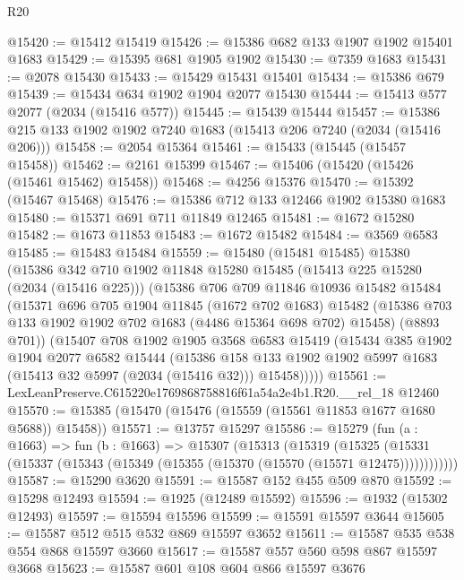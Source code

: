 \begin{lexlean}{R20}
\begin{coremodule}
@15420 := @15412 @15419
@15426 := @15386 @682 @133 @1907 @1902 @15401 @1683
@15429 := @15395 @681 @1905 @1902
@15430 := @7359 @1683
@15431 := @2078 @15430
@15433 := @15429 @15431 @15401
@15434 := @15386 @679
@15439 := @15434 @634 @1902 @1904 @2077 @15430
@15444 := @15413 @577 @2077 (@2034 (@15416 @577))
@15445 := @15439 @15444
@15457 := @15386 @215 @133 @1902 @1902 @7240 @1683 (@15413 @206 @7240 (@2034 (@15416 @206)))
@15458 := @2054 @15364
@15461 := @15433 (@15445 (@15457 @15458))
@15462 := @2161 @15399
@15467 := @15406 (@15420 (@15426 (@15461 @15462) @15458))
@15468 := @4256 @15376
@15470 := @15392 (@15467 @15468)
@15476 := @15386 @712 @133 @12466 @1902 @15380 @1683
@15480 := @15371 @691 @711 @11849 @12465
@15481 := @1672 @15280
@15482 := @1673 @11853
@15483 := @1672 @15482
@15484 := @3569 @6583
@15485 := @15483 @15484
@15559 := @15480
    (@15481 @15485)
    @15380
    (@15386
      @342
      @710
      @1902
      @11848
      @15280
      @15485
      (@15413 @225 @15280 (@2034 (@15416 @225)))
      (@15386
        @706
        @709
        @11846
        @10936
        @15482
        @15484
        (@15371
          @696
          @705
          @1904
          @11845
          (@1672 @702 @1683)
          @15482
          (@15386 @703 @133 @1902 @1902 @702 @1683 (@4486 @15364 @698 @702) @15458)
          (@8893 @701))
        (@15407
          @708
          @1902
          @1905
          @3568
          @6583
          @15419
          (@15434
            @385
            @1902
            @1904
            @2077
            @6582
            @15444
            (@15386
              @158
              @133
              @1902
              @1902
              @5997
              @1683
              (@15413 @32 @5997 (@2034 (@15416 @32)))
              @15458)))))
@15561 := LexLeanPreserve.C615220e1769868758816f61a54a2e4b1.R20.__rel_18 @12460
@15570 := @15385 (@15470 (@15476 (@15559 (@15561 @11853 @1677 @1680 @5688)) @15458))
@15571 := @13757 @15297
@15586 := @15279
    (fun (a : @1663) =>
    fun (b : @1663) =>
    @15307
      (@15313
        (@15319
          (@15325 (@15331 (@15337 (@15343 (@15349 (@15355 (@15370 (@15570 (@15571 @12475))))))))))))
@15587 := @15290 @3620
@15591 := @15587 @152 @455 @509 @870
@15592 := @15298 @12493
@15594 := @1925 (@12489 @15592)
@15596 := @1932 (@15302 @12493)
@15597 := @15594 @15596
@15599 := @15591 @15597 @3644
@15605 := @15587 @512 @515 @532 @869 @15597 @3652
@15611 := @15587 @535 @538 @554 @868 @15597 @3660
@15617 := @15587 @557 @560 @598 @867 @15597 @3668
@15623 := @15587 @601 @108 @604 @866 @15597 @3676

\end{coremodule}
\end{lexlean}
